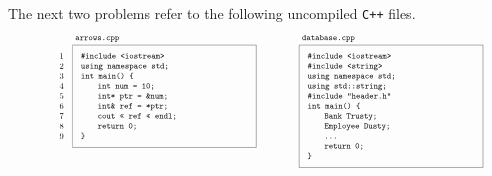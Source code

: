 \documentclass[a4paper,12pt]{article}
\newcommand\indd{${}$\hspace{20pt}}
\begin{document}
\noindent
The next two problems refer to the following uncompiled \texttt{C++} files.
\[
\scalebox{.6}{ 
\begin{tikzpicture}
\node[draw,anchor=north,inner sep=10pt] (arrows) at (-10,0) {\parbox{7cm}{\raggedright
\texttt{\#include <iostream>}\linebreak
\texttt{using namespace std;}\linebreak
\texttt{int main() \{}\linebreak
\indd\texttt{int num = 10;}\linebreak
\indd\texttt{int* ptr = \&num;}\linebreak
\indd\texttt{int\& ref = *ptr;}\linebreak
\indd\texttt{cout << ref << endl;}\linebreak
\indd\texttt{return 0;}\linebreak
\texttt{\}}
}};
\node[anchor=south west] at (arrows.north west) {\texttt{arrows.cpp}};
\node[draw=white,anchor=north,inner sep=10pt,anchor=north east] at (arrows.north west) {\parbox{.7cm}{\raggedleft
1\linebreak 2\linebreak 3\linebreak 4\linebreak 5\linebreak 6\linebreak 7\linebreak 8\linebreak 9\linebreak}};


\node[draw,anchor=north,inner sep=10pt] (cpp) at (-.5,0) {\parbox{7cm}{\raggedright
\texttt{\#include <iostream>}\linebreak
\texttt{\#include <string>}\linebreak
\texttt{using namespace std;}\linebreak
\texttt{using std::string;}\linebreak
\texttt{\#include "header.h"}\linebreak
\texttt{int main() \{}\linebreak
\indd\texttt{Bank Trusty;}\linebreak
\indd\texttt{Employee Dusty;}\linebreak
\indd\texttt{...}\linebreak
\indd\texttt{return 0;}\linebreak
\texttt{\}}
}};
\node[anchor=south west] at (cpp.north west) {\texttt{database.cpp}};



\end{tikzpicture}}\]
\end{document}

